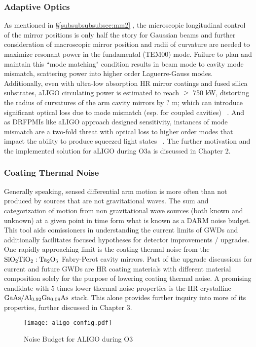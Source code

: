 \subsubsection{Adaptive Optics}
As mentioned in \hyperref[subsubsubsubsec:mm2]{\S \ref*{subsubsubsubsec:mm2}} , the microscopic longitudinal control of the mirror positions is only half the story for Gaussian beams and further consideration of macroscopic mirror position and radii of curvature are needed to maximize resonant power in the fundamental (TEM00) mode. Failure to plan and maintain this ``mode matching" condition results in beam mode to cavity mode mismatch, scattering power into higher order Laguerre-Gauss modes. Additionally, even with ultra-low absorption HR mirror coatings and fused silica substrates, aLIGO circulating power is estimated to reach $\geq$ 750 kW, distorting the radius of curvatures of the arm cavity mirrors by ? m; which can introduce significant optical loss due to mode mismatch (esp. for coupled cavities) ~\cite{tvo}. And as DRFPMIs like aLIGO approach designed sensitivity, instances of mode mismatch are a two-fold threat with optical loss to higher order modes that impact the ability to produce squeezed light states ~\cite{oelker:2014}. The further motivation and the implemented solution for aLIGO during O3a is discussed in Chapter 2. 


\subsubsection{Coating Thermal Noise}\label{introCTN}
Generally speaking, sensed differential arm motion is more often than not produced by sources that are not gravitational waves. The sum and categorization of motion from non gravitational wave sources (both known and unknown) at a given point in time form what is known as a DARM noise budget. This tool aids comissioners in understanding the current limits of GWDs and additionally facilitates focused hypotheses for detector improvements / upgrades. One rapidly approaching limit is the coating thermal noise from the $\mathrm{SiO_2}\mathrm{TiO_2:Ta_2O_5}$ Fabry-Perot cavity mirrors. Part of the upgrade discussions for current and future GWDs are HR coating materials with different material composition solely for the purpose of lowering coating thermal noise. A promising candidate with 5 times lower thermal noise properties is the HR crystalline $\mathrm{GaAs}/\mathrm{Al_{0.92}Ga_{0.08}As}$ stack. This alone provides further inquiry into more of its properties, further discussed in Chapter 3.   

\begin{figure}[H]
  \begin{center}
	  \texttt{[image: aligo\_config.pdf]}
  \end{center}
  \caption{Noise Budget for ALIGO during O3}
  \label{fig:noisebudget}
\end{figure}



